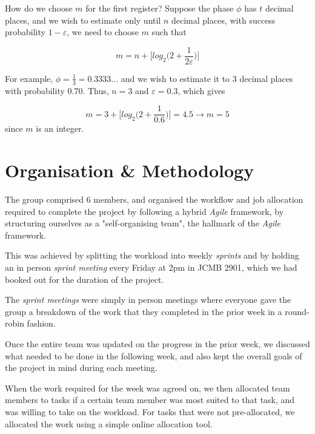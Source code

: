 \documentclass{article}
\begin{document}
\vspace{10mm} 

\noindent 
How do we choose $m$ for the first register? Suppose the phase $\phi$ has $t$ decimal places, and we wish to estimate only until $n$ decimal places, with success probability $1-\varepsilon$, we need to choose $m$ such that \cite{nielsen_quantum_2010}
\vspace{5mm}

\begin{equation}
m=n+\bigg[log_2\bigg(2+\frac{1}{2\varepsilon}\bigg)\bigg]    
\end{equation}

For example, $\phi = \frac{1}{3} = 0.3333...$ and we wish to estimate it to 3 decimal places with probability 0.70. Thus, $n=3$ and $\varepsilon = 0.3$, which gives 
\vspace{5mm}

\begin{equation}
m = 3 + \bigg[log_2\bigg(2+\frac{1}{0.6}\bigg)\bigg]=4.5 \rightarrow m=5    
\end{equation} since $m$ is an integer.

\pagebreak

\section{Organisation \& Methodology}

The group comprised 6 members, and organised the workflow and job allocation required to complete the project by following a hybrid \textit{Agile}\cite{noauthor_manifesto_nodate} framework, by structuring ourselves as a "self-organising team", the hallmark of the \textit{Agile} framework.

This was achieved by splitting the workload into weekly \textit{sprints} and by holding an in person \textit{sprint meeting} every Friday at 2pm in JCMB 2901, which we had booked out for the duration of the project.

The \textit{sprint meetings} were simply in person meetings where everyone gave the group a breakdown of the work that they completed in the prior week in a round-robin fashion.

Once the entire team was updated on the progress in the prior week, we discussed what needed to be done in the following week, and also kept the overall goals of the project in mind during each meeting.

When the work required for the week was agreed on, we then allocated team members to tasks if a certain team member was most suited to that task, and was willing to take on the workload. For tasks that were not pre-allocated, we allocated the work using a simple online allocation tool.
\end{document}
